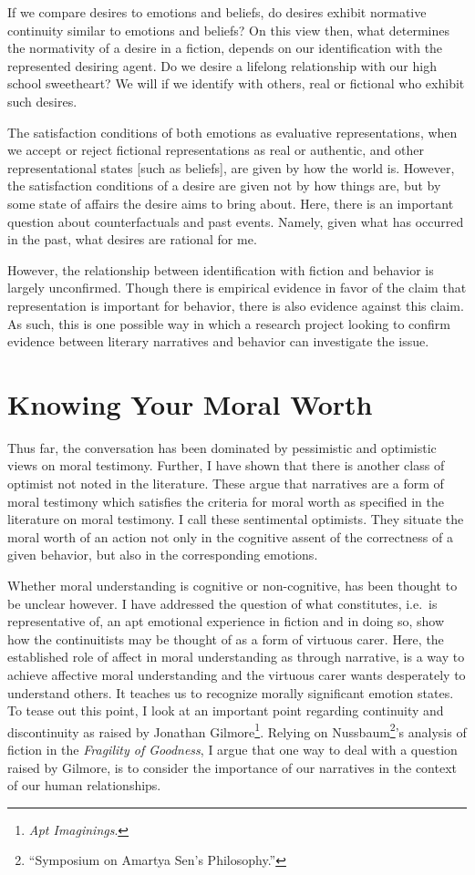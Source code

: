 \documentclass[phdthesis,12pt,final]{wuthesis}
\theoremstyle{definition}
\theoremstyle{definition}
\theoremstyle{definition}
\theoremstyle{definition}
\theoremstyle{remark}
\begin{document}
If we compare desires to emotions and beliefs, do desires exhibit normative continuity similar to emotions and beliefs? On this view then, what determines the normativity of a desire in a fiction, depends on our identification with the represented desiring agent. Do we desire a lifelong relationship with our high school sweetheart? We will if we identify with others, real or fictional who exhibit such desires.

The satisfaction conditions of both emotions as evaluative representations, when we accept or reject fictional representations as real or authentic, and other representational states {[}such as beliefs{]}, are given by how the world is. However, the satisfaction conditions of a desire are given not by how things are, but by some state of affairs the desire aims to bring about. Here, there is an important question about counterfactuals and past events. Namely, given what has occurred in the past, what desires are rational for me.

However, the relationship between identification with fiction and behavior is largely unconfirmed. Though there is empirical evidence in favor of the claim that representation is important for behavior, there is also evidence against this claim. As such, this is one possible way in which a research project looking to confirm evidence between literary narratives and behavior can investigate the issue.

\chapter{Knowing Your Moral Worth}\label{knowing-your-moral-worth}

Thus far, the conversation has been dominated by pessimistic and optimistic views on moral testimony. Further, I have shown that there is another class of optimist not noted in the literature. These argue that narratives are a form of moral testimony which satisfies the criteria for moral worth as specified in the literature on moral testimony. I call these sentimental optimists. They situate the moral worth of an action not only in the cognitive assent of the correctness of a given behavior, but also in the corresponding emotions.

Whether moral understanding is cognitive or non-cognitive, has been thought to be unclear however. I have addressed the question of what constitutes, i.e.~is representative of, an apt emotional experience in fiction and in doing so, show how the continuitists may be thought of as a form of virtuous carer. Here, the established role of affect in moral understanding as through narrative, is a way to achieve affective moral understanding and the virtuous carer wants desperately to understand others. It teaches us to recognize morally significant emotion states. To tease out this point, I look at an important point regarding continuity and discontinuity as raised by Jonathan Gilmore\footnote{\emph{Apt {Imaginings}}.}. Relying on Nussbaum\footnote{{``Symposium on {Amartya Sen}'s Philosophy.''}}'s analysis of fiction in the \emph{Fragility of Goodness}, I argue that one way to deal with a question raised by Gilmore, is to consider the importance of our narratives in the context of our human relationships.
\end{document}
